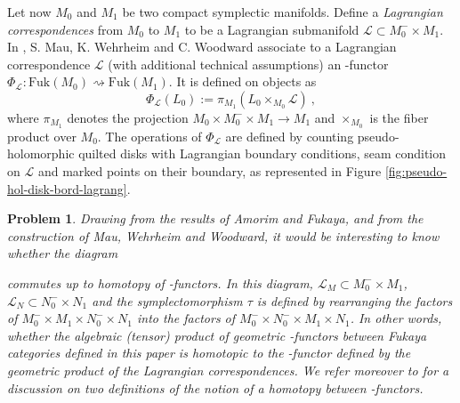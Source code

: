 \documentclass[twoside, 12pt]{amsart}
\newtheorem*{problem}{Problem}
\theoremstyle{remark}
\begin{document}
Let now $M_0$ and $M_1$ be two compact symplectic manifolds. Define a \emph{Lagrangian correspondences} from $M_0$ to $M_1$ to be a Lagrangian submanifold $\mathcal{L} \subset M_0^{-} \times M_1$.
In \cite{mau-wehrheim-woodward}, S. Mau, K. Wehrheim and C. Woodward associate to a Lagrangian correspondence $\mathcal{L}$ (with additional technical assumptions) an \Ainf -functor $\Phi_{\mathcal{L}} : \mathrm{Fuk}(M_0) \rightsquigarrow \mathrm{Fuk}(M_1)$.  
It is defined on objects as 
\[ \Phi_{\mathcal{L}} (L_0) := \pi_{M_1} ( L_0 \times_{M_0} \mathcal{L} ) \ , \]
where $\pi_{M_1}$ denotes the projection $M_0 \times M_0^{-} \times M_1 \rightarrow M_1$ and $\times_{M_0}$ is the fiber product over $M_0$. The operations of $\Phi_{\mathcal{L}}$ are defined by counting pseudo-holomorphic quilted disks with Lagrangian boundary conditions, seam condition on $\mathcal{L}$ and marked points on their boundary, as represented in Figure \ref{fig:pseudo-hol-disk-bord-lagrang}. 

\begin{problem}
Drawing from the results of Amorim and Fukaya, and from the construction of Mau, Wehrheim and Woodward, it would be interesting to know whether the diagram
\begin{center} 
\end{center}
commutes up to homotopy of \Ainf -functors. In this diagram, $\mathcal{L}_M \subset M_0^{-} \times M_1$, $\mathcal{L}_N \subset N_0^- \times N_1$ and the symplectomorphism $\tau$ is defined by rearranging the factors of $M_0^{-} \times M_1 \times N_0^- \times N_1$ into the factors of $M_0^{-} \times N_0^- \times M_1 \times N_1$. In other words, whether the \emph{algebraic (tensor) product} of geometric \Ainf -functors between Fukaya categories defined in this paper is homotopic to the \Ainf -functor defined by the \emph{geometric product} of the Lagrangian correspondences. We refer moreover to \cite[Section 13]{fukaya-unobstructed} for a discussion on two definitions of the notion of a homotopy between \Ainf -functors.
\end{problem}
\end{document}

